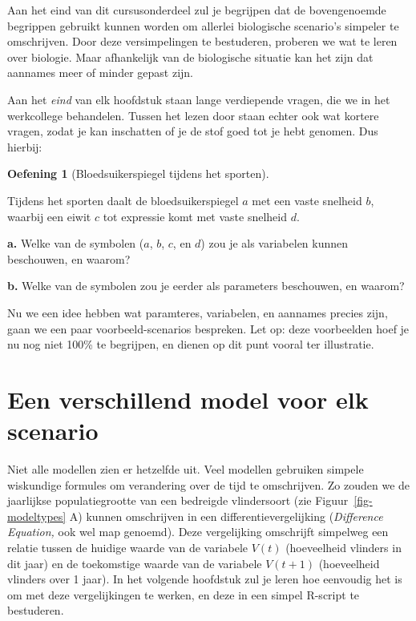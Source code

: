 \documentclass[
  a4paper,
]{scrbook}
\theoremstyle{definition}
\newtheorem{exercise}{Oefening}[chapter]
\theoremstyle{remark}
\begin{document}
Aan het eind van dit cursusonderdeel zul je begrijpen dat de
bovengenoemde begrippen gebruikt kunnen worden om allerlei biologische
scenario's simpeler te omschrijven. Door deze versimpelingen te
bestuderen, proberen we wat te leren over biologie. Maar afhankelijk van
de biologische situatie kan het zijn dat aannames meer of minder gepast
zijn.

Aan het \emph{eind} van elk hoofdstuk staan lange verdiepende vragen,
die we in het werkcollege behandelen. Tussen het lezen door staan echter
ook wat kortere vragen, zodat je kan inschatten of je de stof goed tot
je hebt genomen. Dus hierbij:

\begin{exercise}[Bloedsuikerspiegel tijdens het
sporten]\protect\hypertarget{exr-variabelen-en-parameters}{}\label{exr-variabelen-en-parameters}

Tijdens het sporten daalt de bloedsuikerspiegel \(a\) met een vaste
snelheid \(b\), waarbij een eiwit \(c\) tot expressie komt met vaste
snelheid \(d\).

\textbf{a.} Welke van de symbolen (\(a\), \(b\), \(c\), en \(d\)) zou je
als variabelen kunnen beschouwen, en waarom?

\textbf{b.} Welke van de symbolen zou je eerder als parameters
beschouwen, en waarom?

\end{exercise}

Nu we een idee hebben wat paramteres, variabelen, en aannames precies
zijn, gaan we een paar voorbeeld-scenarios bespreken. Let op: deze
voorbeelden hoef je nu nog niet 100\% te begrijpen, en dienen op dit
punt vooral ter illustratie.

\hypertarget{een-verschillend-model-voor-elk-scenario}{%
\section{Een verschillend model voor elk
scenario}\label{een-verschillend-model-voor-elk-scenario}}

Niet alle modellen zien er hetzelfde uit. Veel modellen gebruiken
simpele wiskundige formules om verandering over de tijd te omschrijven.
Zo zouden we de jaarlijkse populatiegrootte van een bedreigde
vlindersoort (zie Figuur~\ref{fig-modeltypes} A) kunnen omschrijven in
een differentievergelijking (\emph{Difference Equation,} ook wel map
genoemd). Deze vergelijking omschrijft simpelweg een relatie tussen de
huidige waarde van de variabele \(V(t)\) (hoeveelheid vlinders in dit
jaar) en de toekomstige waarde van de variabele \(V(t+1)\) (hoeveelheid
vlinders over 1 jaar). In het volgende hoofdstuk zul je leren hoe
eenvoudig het is om met deze vergelijkingen te werken, en deze in een
simpel R-script te bestuderen.
\end{document}
